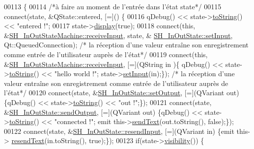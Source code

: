 \begin{DoxyCode}
00113 \{
00114     \textcolor{comment}{/*à faire au moment de l'entrée dans l'état state*/}
00115     connect(state, &QState::entered, [=]() \{
00116         qDebug() << state->\hyperlink{classSH__GenericState_a7779babbb40f3f8faa71112204d9804f}{toString}() << \textcolor{stringliteral}{"entered !"};
00117         state->\hyperlink{classSH__InOutState_a616f88b20478b81b2927a9ddc2b4f521}{display}(\textcolor{keyword}{true});
00118         connect(\textcolor{keyword}{this}, &\hyperlink{classSH__InOutStateMachine_a037ed5e13ecfae2123a8d4940292e410}{SH\_InOutStateMachine::receiveInput}, state, &
      \hyperlink{classSH__InOutState_aaec9c2b5ef7c406bff7469461352d47c}{SH\_InOutState::setInput}, Qt::QueuedConnection); \textcolor{comment}{/* la réception d'une valeur
       entraîne son enregistrement comme entrée de l'utilisateur auprès de l'état*/}
00119         connect(\textcolor{keyword}{this}, &\hyperlink{classSH__InOutStateMachine_a037ed5e13ecfae2123a8d4940292e410}{SH\_InOutStateMachine::receiveInput}, [=](QString in
      )\{ qDebug() << state->\hyperlink{classSH__GenericState_a7779babbb40f3f8faa71112204d9804f}{toString}() << \textcolor{stringliteral}{"hello world !"}; state->\hyperlink{classSH__InOutState_aaec9c2b5ef7c406bff7469461352d47c}{setInput}(in);\}); \textcolor{comment}{/* la réception
       d'une valeur entraîne son enregistrement comme entrée de l'utilisateur auprès de l'état*/}
00120         connect(state, &\hyperlink{classSH__InOutState_af611c84134e262739cd834797b315c80}{SH\_InOutState::setOutput}, [=](QVariant out) \{qDebug() << 
      state->\hyperlink{classSH__GenericState_a7779babbb40f3f8faa71112204d9804f}{toString}() << \textcolor{stringliteral}{"out !"};\});
00121         connect(state, &\hyperlink{classSH__InOutState_a77921c5f42059bc97361f4ff7827da12}{SH\_InOutState::sendOutput}, [=](QVariant out) \{qDebug() << 
      state->\hyperlink{classSH__GenericState_a7779babbb40f3f8faa71112204d9804f}{toString}() << \textcolor{stringliteral}{"connected !"}; emit this->\hyperlink{classSH__InOutStateMachine_a5e7f5958bae31696b6a8deab94ad2b4f}{sendText}(out.toString(), \textcolor{keyword}{false});\});
00122         connect(state, &\hyperlink{classSH__InOutState_a1f00480afefd173002cf56d4c4128048}{SH\_InOutState::resendInput}, [=](QVariant in) \{emit this->
      \hyperlink{classSH__InOutStateMachine_a526822c66b46aa0cd81ba4473fa5573f}{resendText}(in.toString(), \textcolor{keyword}{true});\});
00123         \textcolor{keywordflow}{if}(state->\hyperlink{classSH__InOutState_a3a18752c4122c26a2ebf38310c9c1b75}{visibility}()) \{

\end{DoxyCode}
